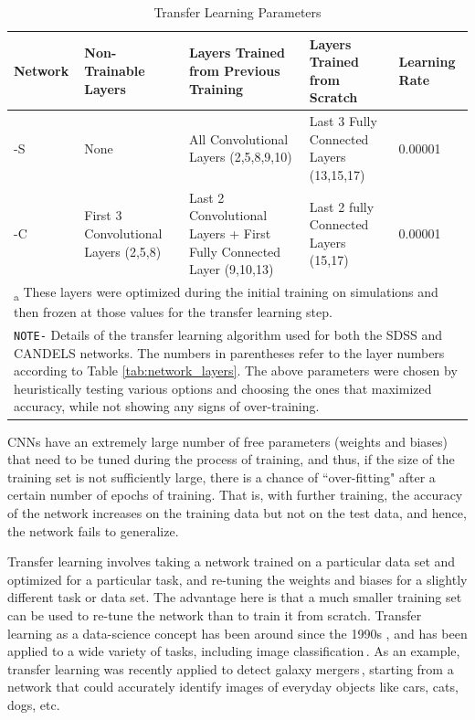 \begin{table}[htbp]
  \centering
  \caption{Transfer Learning Parameters \label{tab:tl_para}}
  \begin{tabular}{p{2.5cm}p{2.5cm}p{3.25cm}p{3.25cm}p{1.25cm}}
  \hline
  \hline
  Network & Non-Trainable Layers & Layers Trained from Previous Training & Layers Trained from Scratch & Learning Rate \\
  \hline
  \gamornet{}-S & None & All Convolutional Layers (2,5,8,9,10) & Last 3 Fully Connected Layers (13,15,17) & 0.00001 \\
  \hline
  \gamornet{}-C & First 3 Convolutional Layers (2,5,8) & Last 2 Convolutional Layers + First Fully Connected Layer (9,10,13)& Last 2 fully Connected Layers (15,17) & 0.00001 \\
  \hline
  \multicolumn{5}{p{0.9\textwidth}}{\vskip 0.1cm \small \textsubscript{a} These layers were optimized during the initial training on simulations and then frozen at those values for the transfer learning step.} \\
  \multicolumn{5}{p{0.9\textwidth}}{ \small \texttt{NOTE-} Details of the transfer learning algorithm used for both the SDSS and CANDELS networks. The numbers in parentheses refer to the layer numbers according to Table \ref{tab:network_layers}. The above parameters were chosen by heuristically testing various options and choosing the ones that maximized accuracy, while not showing any signs of over-training.}
  \end{tabular}
\end{table}

CNNs have an extremely large number of free parameters (weights and biases) that need to be tuned during the process of training, and thus, if the size of the training set is not sufficiently large, there is a chance of ``over-fitting" after a certain number of epochs of training. That is, with further training, the accuracy of the network increases on the training data but not on the test data, and hence, the network fails to generalize. 

Transfer learning involves taking a network trained on a particular data set and optimized for a particular task, and re-tuning the weights and biases for a slightly different task or data set. The advantage here is that a much smaller training set can be used to re-tune the network than to train it from scratch. Transfer learning as a data-science concept has been around since the 1990s \citep{Pan2010}, and has been applied to a wide variety of tasks, including image classification\,\citep{zhu2011,Kulis2011,Duan2012}. As an example, transfer learning was recently applied to detect galaxy mergers\,\citep{ml_mergers}, starting from a network that could accurately identify images of everyday objects like cars, cats, dogs, etc.

